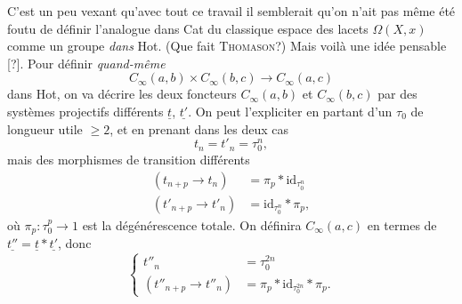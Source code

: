 \documentclass[11pt]{article}
\newcommand{\printedpage}[1]{\marginpar{\footnotesize p.~#1}}
\begin{document}
C'est un peu vexant qu'avec tout ce travail il semblerait qu'on n'ait pas même été foutu de définir l'analogue dans Cat du classique espace des lacets $\Omega(X, x)$ comme un groupe \textit{dans} Hot. (Que fait \textsc{Thomason}?) Mais voilà une idée pensable [?]. Pour définir \textit{quand-même}
\[
C_\infty(a,b) \times C_\infty(b,c) \longrightarrow C_\infty(a,c)
\]
dans Hot, on va décrire les deux foncteurs $C_\infty(a,b)$ et $C_\infty(b,c)$ par des systèmes projectifs différents $\underline{t}$, $\underline{t'}$. On peut l'expliciter en partant d'un $\tau_0$ de longueur utile $\geq 2$, et en prenant dans les deux cas
\[
t_n = t'_n = \tau_0^n,
\]
mais des morphismes de transition différents
\[
\begin{aligned}
(t_{n+p} \longrightarrow t_n) &= \pi_p * \mathrm{id}_{\tau_0^n} \\
(t'_{n+p} \longrightarrow t'_n) &= \mathrm{id}_{\tau_0^n} * \pi_p,
\end{aligned}
\]
où $\pi_p : \tau_0^p \longrightarrow 1$ est la dégénérescence totale. On définira $C_\infty(a,c)$ en termes de $\underline{t''} = \underline{t} * \underline{t'}$, donc
\[
\left\{
\begin{aligned}
t''_n &= \tau_0^{2n} \\
(t''_{n+p} \longrightarrow t''_n) &= \pi_p * \mathrm{id}_{\tau_0^{2n}} * \pi_p.
\end{aligned}
\right.
\]

\printedpage{79}
\end{document}
